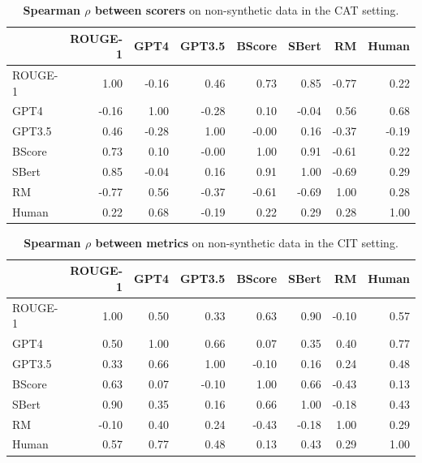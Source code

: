 \begin{table}
    \centering
    \begin{tabular}{lrrrrrrr}
    \toprule
     & ROUGE-1 & GPT4 & GPT3.5 & BScore & SBert & RM & Human \\
    \midrule
    ROUGE-1 & 1.00 & -0.16 & 0.46 & 0.73 & 0.85 & -0.77 & 0.22 \\
    GPT4 & -0.16 & 1.00 & -0.28 & 0.10 & -0.04 & 0.56 & 0.68 \\
    GPT3.5 & 0.46 & -0.28 & 1.00 & -0.00 & 0.16 & -0.37 & -0.19 \\
    BScore & 0.73 & 0.10 & -0.00 & 1.00 & 0.91 & -0.61 & 0.22 \\
    SBert & 0.85 & -0.04 & 0.16 & 0.91 & 1.00 & -0.69 & 0.29 \\
    RM & -0.77 & 0.56 & -0.37 & -0.61 & -0.69 & 1.00 & 0.28 \\
    Human & 0.22 & 0.68 & -0.19 & 0.22 & 0.29 & 0.28 & 1.00 \\
    \bottomrule
    \end{tabular}
    \caption[Spearman $\rho$ between scorers]{\textbf{Spearman $\rho$ between scorers} on non-synthetic data in the CAT setting.}
    \label{tab:exp1b_corr}
\end{table}


\begin{table}
    \centering
    \begin{tabular}{lrrrrrrr}
    \toprule
     & ROUGE-1 & GPT4 & GPT3.5 & BScore & SBert & RM & Human \\
    \midrule
    ROUGE-1 & 1.00 & 0.50 & 0.33 & 0.63 & 0.90 & -0.10 & 0.57 \\
    GPT4 & 0.50 & 1.00 & 0.66 & 0.07 & 0.35 & 0.40 & 0.77 \\
    GPT3.5 & 0.33 & 0.66 & 1.00 & -0.10 & 0.16 & 0.24 & 0.48 \\
    BScore & 0.63 & 0.07 & -0.10 & 1.00 & 0.66 & -0.43 & 0.13 \\
    SBert & 0.90 & 0.35 & 0.16 & 0.66 & 1.00 & -0.18 & 0.43 \\
    RM & -0.10 & 0.40 & 0.24 & -0.43 & -0.18 & 1.00 & 0.29 \\
    Human & 0.57 & 0.77 & 0.48 & 0.13 & 0.43 & 0.29 & 1.00 \\
    \bottomrule
    \end{tabular}
    \caption[Spearman $\rho$ between metrics]{\textbf{Spearman $\rho$ between metrics} on non-synthetic data in the CIT setting.}
    \label{tab:exp1b_mean}
\end{table}

